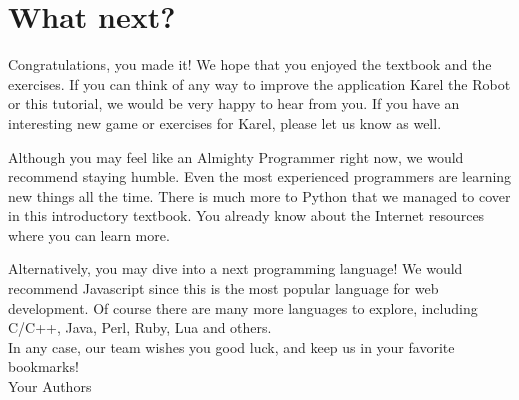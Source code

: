 \documentclass[article,A4,12pt]{llncs}
\begin{document}


\section{What next?}

Congratulations, you made it! We hope that you enjoyed the textbook and the 
exercises. If you can think of any way to improve the application Karel the 
Robot or this tutorial, we would be very happy to hear from you. If you 
have an interesting new game or exercises for Karel, please let us know as well. 

Although you may feel like an Almighty Programmer right now, we would
recommend staying humble. Even the most experienced programmers are
learning new things all the time. There is much more to Python that 
we managed to cover in this introductory textbook. You already know 
about the Internet resources where you can learn more.  

Alternatively, you may dive into a next programming language! We would 
recommend Javascript since this is the most popular language for web 
development. Of course there are many more languages to explore, including 
C/C++, Java, Perl, Ruby, Lua and others.\\

\noindent
In any case, our team wishes you good luck, and keep us in your 
favorite bookmarks! \\

\hbox{} \hfill{} Your Authors
\end{document}

